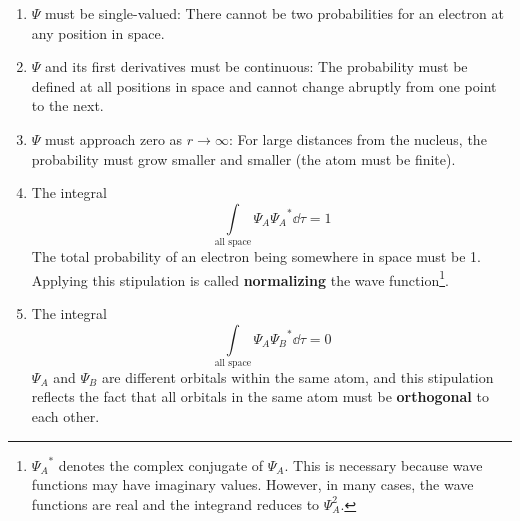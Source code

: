 \documentclass[../main.tex]{subfiles}
\begin{document}
\begin{itemize}
    \begin{enumerate}
        \item $\Psi$ must be single-valued: There cannot be two probabilities for an electron at any position in space.
        \item $\Psi$ and its first derivatives must be continuous: The probability must be defined at all positions in space and cannot change abruptly from one point to the next.
        \item $\Psi$ must approach zero as $r\to\infty$: For large distances from the nucleus, the probability must grow smaller and smaller (the atom must be finite).
        \item The integral
        \begin{equation*}
            \int\limits_\text{all space}\Psi_A{\Psi_A}^*\dd{\tau} = 1
        \end{equation*}
        The total probability of an electron being somewhere in space must be 1. Applying this stipulation is called \textbf{normalizing} the wave function\footnote{${\Psi_A}^*$ denotes the complex conjugate of $\Psi_A$. This is necessary because wave functions may have imaginary values. However, in many cases, the wave functions are real and the integrand reduces to $\Psi_A^2$.}.
        \item The integral
        \begin{equation*}
            \int\limits_\text{all space}\Psi_A{\Psi_B}^*\dd{\tau} = 0
        \end{equation*}
        $\Psi_A$ and $\Psi_B$ are different orbitals within the same atom, and this stipulation reflects the fact that all orbitals in the same atom must be \textbf{orthogonal} to each other.
    \end{enumerate}
\end{itemize}
\end{document}
